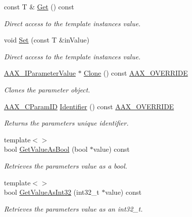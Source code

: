 \begin{DoxyCompactItemize}
const T \& \mbox{\hyperlink{a01533_abdffd43e04bd6cadb2ea4ab48991116c}{Get}} () const
\begin{DoxyCompactList}\small\item\em Direct access to the template instance\textquotesingle{}s value. \end{DoxyCompactList}\item 
void \mbox{\hyperlink{a01533_a72303342bc5133e039264549f3c44d87}{Set}} (const T \&in\+Value)
\begin{DoxyCompactList}\small\item\em Direct access to the template instance\textquotesingle{}s value. \end{DoxyCompactList}\item 
\mbox{\hyperlink{a01853}{A\+A\+X\+\_\+\+I\+Parameter\+Value}} $\ast$ \mbox{\hyperlink{a01533_a6618ae2833e64a3b75752cdbb02d6332}{Clone}} () const \mbox{\hyperlink{a00392_ac2f24a5172689ae684344abdcce55463}{A\+A\+X\+\_\+\+O\+V\+E\+R\+R\+I\+DE}}
\begin{DoxyCompactList}\small\item\em Clones the parameter object. \end{DoxyCompactList}\item 
\mbox{\hyperlink{a00392_a1440c756fe5cb158b78193b2fc1780d1}{A\+A\+X\+\_\+\+C\+Param\+ID}} \mbox{\hyperlink{a01533_ac775643998370e9b70dfac23e8a542c6}{Identifier}} () const \mbox{\hyperlink{a00392_ac2f24a5172689ae684344abdcce55463}{A\+A\+X\+\_\+\+O\+V\+E\+R\+R\+I\+DE}}
\begin{DoxyCompactList}\small\item\em Returns the parameter\textquotesingle{}s unique identifier. \end{DoxyCompactList}\item 
{\footnotesize template$<$$>$ }\\bool \mbox{\hyperlink{a01533_a10763c0784f9e5e62fdadae47a54cee2}{Get\+Value\+As\+Bool}} (bool $\ast$value) const
\begin{DoxyCompactList}\small\item\em Retrieves the parameter\textquotesingle{}s value as a bool. \end{DoxyCompactList}\item 
{\footnotesize template$<$$>$ }\\bool \mbox{\hyperlink{a01533_a8df0b77c93c527392e51e3d82d026d87}{Get\+Value\+As\+Int32}} (int32\+\_\+t $\ast$value) const
\begin{DoxyCompactList}\small\item\em Retrieves the parameter\textquotesingle{}s value as an int32\+\_\+t. \end{DoxyCompactList}\item 

\end{DoxyCompactItemize}
